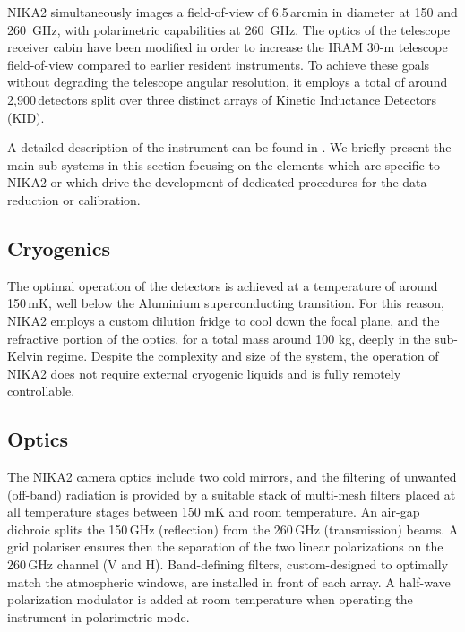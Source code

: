 
NIKA2 simultaneously images a field-of-view of
6.5\,arcmin in diameter at 150 and 260~GHz, with polarimetric capabilities at
260~GHz. The optics of the telescope receiver cabin have been modified in order
to increase the IRAM 30-m telescope field-of-view compared to earlier
resident instruments. To achieve these goals without degrading the
telescope angular resolution, it employs a total of around
2,900\,detectors split over three distinct arrays of Kinetic
Inductance Detectors (KID).

A detailed description of the instrument can be found in
\citet{Adam2018}. We briefly present the main sub-systems in this
section focusing on the elements which are specific to NIKA2 or
which drive the development of dedicated procedures for the data reduction or
calibration.


\subsection{Cryogenics}

The optimal operation of the detectors is achieved at a temperature of around
150\,mK, well below the Aluminium superconducting transition. For this reason,
NIKA2 employs a custom dilution fridge to cool down the focal plane, and the
refractive portion of the optics, for a total mass around 100 kg, deeply in the
sub-Kelvin regime. Despite the complexity and size of the system, the operation
of NIKA2 does not require external cryogenic liquids and is fully remotely
controllable.


\subsection{Optics}

The NIKA2 camera optics include two cold mirrors, and the filtering of unwanted
(off-band) radiation is provided by a suitable stack of multi-mesh filters
placed at all temperature stages between 150 mK and room temperature. An air-gap
dichroic splits the 150\,GHz (reflection) from the 260\,GHz (transmission)
beams. A grid polariser ensures then the separation of the two linear
polarizations on the 260\,GHz channel (V and H). Band-defining filters,
custom-designed to optimally match the atmospheric windows, are installed in
front of each array. A half-wave polarization modulator is added at room
temperature when operating the instrument in polarimetric mode.

